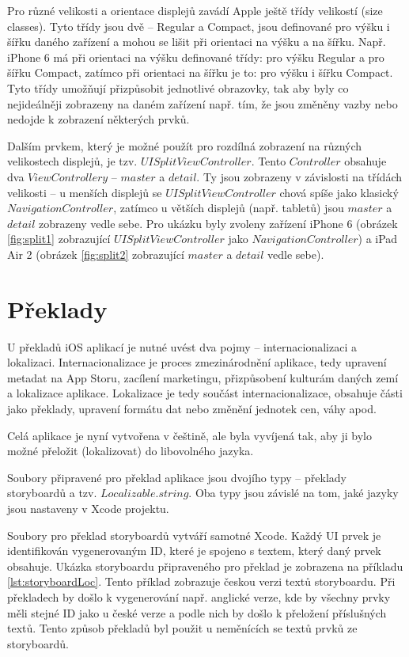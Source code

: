 \documentclass[thesis=M,czech]{FITthesis}[2012/06/26]
\begin{document}
Pro různé velikosti a orientace displejů zavádí Apple ještě třídy velikostí (size classes). Tyto třídy jsou dvě -- Regular a Compact, jsou definované pro výšku i šířku daného zařízení a mohou se lišit při orientaci na výšku a na šířku. Např. iPhone 6 má při orientaci na výšku definované třídy: pro výšku Regular a pro šířku Compact, zatímco při orientaci na šířku je to: pro výšku i šířku Compact. Tyto třídy umožňují přizpůsobit jednotlivé obrazovky, tak aby byly co nejideálněji zobrazeny na daném zařízení např. tím, že jsou změněny vazby nebo nedojde k zobrazení některých prvků. \cite{sizeClasses}

Dalším prvkem, který je možné použít pro rozdílná zobrazení na různých velikostech displejů, je tzv. $UISplitViewController$. Tento $Controller$ obsahuje dva $ViewControllery$ -- $master$ a $detail$. Ty jsou zobrazeny v závislosti na třídách velikosti -- u menších displejů se $UISplitViewController$ chová spíše jako klasický $NavigationController$, zatímco u větších displejů (např. tabletů) jsou $master$ a $detail$ zobrazeny vedle sebe. \cite{splitVC} Pro ukázku byly zvoleny zařízení iPhone 6 (obrázek \ref{fig:split1} zobrazující $UISplitViewController$ jako $NavigationController$) a iPad Air 2 (obrázek \ref{fig:split2} zobrazující $master$ a $detail$ vedle sebe).

\section{Překlady}
U překladů iOS aplikací je nutné uvést dva pojmy -- internacionalizaci a lokalizaci. Internacionalizace je proces zmezinárodnění aplikace, tedy upravení metadat na App Storu, zacílení marketingu, přizpůsobení kulturám daných zemí a lokalizace aplikace. Lokalizace je tedy součást internacionalizace, obsahuje části jako překlady, upravení formátu dat nebo změnění jednotek cen, váhy apod. \cite{internationalization}

Celá aplikace je nyní vytvořena v češtině, ale byla vyvíjená tak, aby ji bylo možné přeložit (lokalizovat) do libovolného jazyka.

Soubory připravené pro překlad aplikace jsou dvojího typy -- překlady storyboardů a tzv. $Localizable.string$. Oba typy jsou závislé na tom, jaké jazyky jsou nastaveny v Xcode projektu.

Soubory pro překlad storyboardů vytváří samotné Xcode. Každý UI prvek je identifikován vygenerovaným ID, které je spojeno s textem, který daný prvek obsahuje. Ukázka storyboardu připraveného pro překlad je zobrazena na příkladu \ref{lst:storyboardLoc}. Tento příklad zobrazuje českou verzi textů storyboardu. Při překladech by došlo k vygenerování např. anglické verze, kde by všechny prvky měli stejné ID jako u české verze a podle nich by došlo k přeložení příslušných textů. Tento způsob překladů byl použit u neměnících se textů prvků ze storyboardů.
\end{document}
